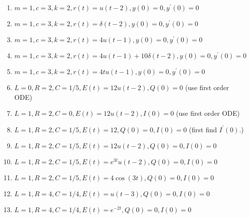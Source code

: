 \begin{enumerate}
\item $m = 1, c = 3, k=2, r(t)=u(t-2), y(0)=0,y^\prime(0)=0$
\item $m = 1, c = 3, k=2, r(t)=\delta(t-2), y(0)=0,y^\prime(0)=0$
\item $m = 1, c = 3, k=2, r(t)=4u(t-1), y(0)=0,y^\prime(0)=0$
\item $m = 1, c = 3, k=2, r(t)=4u(t-1)+10\delta(t-2), y(0)=0,y^\prime(0)=0$
\item $m = 1, c = 3, k=2, r(t)=4t u(t-1), y(0)=0,y^\prime(0)=0$

\item $L = 0, R = 2, C=1/5, E(t)=12 u(t-2), Q(0)=0$ (use first order ODE)
\item $L = 1, R = 2, C=0, E(t)=12 u(t-2), I(0)=0$ (use first order ODE)
\item $L = 1, R = 2, C=1/5, E(t)=12, Q(0)=0,I(0)=0$ (first find $I^\prime(0)$.)
\item $L = 1, R = 2, C=1/5, E(t)=12 u(t-2), Q(0)=0,I(0)=0$
\item $L = 1, R = 2, C=1/5, E(t)=e^{3t} u(t-2), Q(0)=0,I(0)=0$
\item $L = 1, R = 2, C=1/5, E(t)=4\cos (3t), Q(0)=0,I(0)=0$
\item $L = 1, R = 4, C=1/4, E(t)=u(t-3), Q(0)=0,I(0)=0$
\item $L = 1, R = 4, C=1/4, E(t)=e^{-2t}, Q(0)=0,I(0)=0$


\end{enumerate}


\restoregeometry
